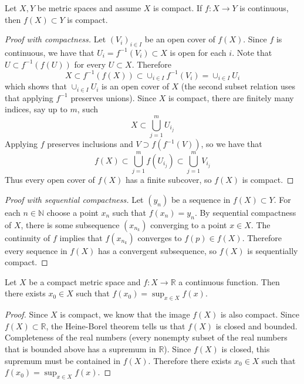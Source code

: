 \documentclass[11pt]{article}
\numberwithin{equation}{section}
\theoremstyle{definition}
\theoremstyle{definition}
\newcommand\inv[1]{#1^{-1}}
\def\ss{\subset}
\newcommand{\1}{\mathbbm 1}
\newcommand{\RR}{\mathbb R}
\newcommand{\NN}{\mathbb N}
\begin{document}
\begin{theorem}
	Let $X,Y$ be metric spaces and assume $X$ is compact. If $f: X \to Y$ is continuous, then $f(X) \subset Y$ is compact. 
\end{theorem}
\begin{proof}[Proof with compactness]
	Let $(V_i)_{i \in I}$ be an open cover of $f(X)$. Since $f$ is continuous, we have that $U_i = f^{-1}(V_i) \subset X$ is open for each $i$. Note that $U \ss \inv{f}(f(U))$ for every $U \subset X$. Therefore
	\begin{equation}
		X \ss \inv{f}(f(X)) \ss \cup_{i \in I} \inv{f}(V_{i}) = \cup_{i \in I} U_{i} 
	\end{equation}
	which shows that $\cup_{i \in I} U_{i}$ is an open cover of $X$ (the second subset relation uses that applying $f^{-1}$ preserves unions). Since $X$ is compact, there are finitely many indices, say up to $m$, such
	\begin{equation}
		X \ss \bigcup_{j=1}^m  U_{i_j}
	\end{equation}
	Applying $f$ preserves inclusions and $V \supset f(\inv{f}(V))$, so we have that
	\begin{equation}
		f(X) \ss \bigcup_{j=1}^m f(U_{i_j}) \ss \bigcup_{j=1}^m V_{i_j}
	\end{equation}
	Thus every open cover of $f(X)$ has a finite subcover, so $f(X)$ is compact. 
\end{proof}

\begin{proof}[Proof with sequential compactness]
	Let $(y_n)$ be a sequence in $f(X) \ss Y$. For each $n \in \NN$ choose a point $x_n$ such that $f(x_n) = y_n$. By sequential compactness of $X$, there is some subsequence $(x_{n_k})$ converging to a point $x \in X$. The continuity of $f$ implies that $f(x_{n_k})$ converges to $f(p) \in f(X)$. Therefore every sequence in $f(X)$ has a convergent subsequence, so $f(X)$ is sequentially compact.  
\end{proof}


\begin{theorem}
	Let $X$ be a compact metric space and $f:X \to \RR$ a continuous function. Then there exists $x_0 \in X$ such that $f(x_0) = \sup_{x\in X} f(x)$. 
\end{theorem}
\begin{proof}
	Since $X$ is compact, we know that the image $f(X)$ is also compact. Since $f(X) \ss \RR$, the Heine-Borel theorem tells us that $f(X)$ is closed and bounded. Completeness of the real numbers (every nonempty subset of the real numbers that is bounded above has a supremum in $\RR$). Since $f(X)$ is closed, this supremum must be contained in $f(X)$. Therefore there exists $x_0 \in X$ such that $f(x_0) = \sup_{x\in X} f(x)$. 
\end{proof}
\end{document}
